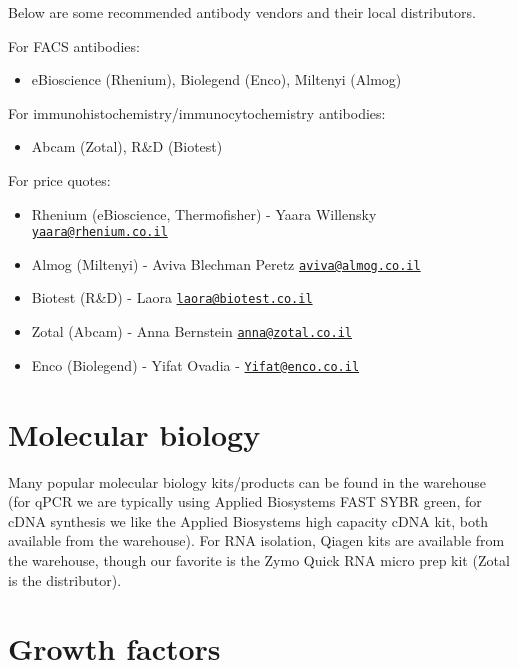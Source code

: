 \documentclass[]{book}
\providecommand{\tightlist}{%
  \setlength{\itemsep}{0pt}\setlength{\parskip}{0pt}}
\begin{document}
Below are some recommended antibody vendors and their local
distributors.

For FACS antibodies:

\begin{itemize}
\tightlist
\item
  eBioscience (Rhenium), Biolegend (Enco), Miltenyi (Almog)
\end{itemize}

For immunohistochemistry/immunocytochemistry antibodies:

\begin{itemize}
\tightlist
\item
  Abcam (Zotal), R\&D (Biotest)
\end{itemize}

For price quotes:

\begin{itemize}
\tightlist
\item
  Rhenium (eBioscience, Thermofisher) - Yaara Willensky
  \href{mailto:yaara@rhenium.co.il}{\nolinkurl{yaara@rhenium.co.il}}
\item
  Almog (Miltenyi) - Aviva Blechman Peretz
  \href{mailto:aviva@almog.co.il}{\nolinkurl{aviva@almog.co.il}}
\item
  Biotest (R\&D) - Laora
  \href{mailto:laora@biotest.co.il}{\nolinkurl{laora@biotest.co.il}}
\item
  Zotal (Abcam) - Anna Bernstein
  \href{mailto:anna@zotal.co.il}{\nolinkurl{anna@zotal.co.il}}
\item
  Enco (Biolegend) - Yifat Ovadia -
  \href{mailto:Yifat@enco.co.il}{\nolinkurl{Yifat@enco.co.il}}
\end{itemize}

\section{Molecular biology}\label{molecular-biology}

Many popular molecular biology kits/products can be found in the
warehouse (for qPCR we are typically using Applied Biosystems FAST SYBR
green, for cDNA synthesis we like the Applied Biosystems high capacity
cDNA kit, both available from the warehouse). For RNA isolation, Qiagen
kits are available from the warehouse, though our favorite is the Zymo
Quick RNA micro prep kit (Zotal is the distributor).

\section{Growth factors}\label{growth-factors}
\end{document}
